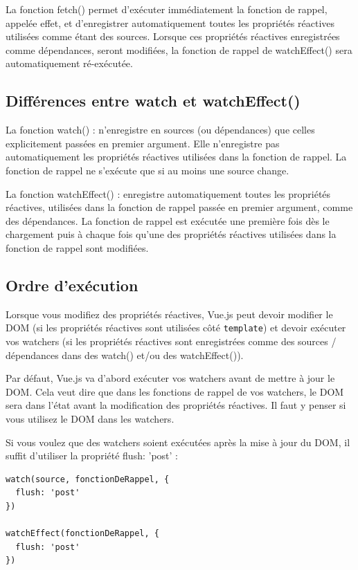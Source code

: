 \documentclass{article}
\begin{document}
La fonction {\color{monOrange}fetch()} permet d'exécuter immédiatement la fonction de rappel, appelée effet, et d'enregistrer automatiquement toutes les propriétés réactives utilisées comme étant des sources. Lorsque ces propriétés réactives enregistrées comme dépendances, seront modifiées, la fonction de rappel de {\color{monOrange}watchEffect()} sera automatiquement ré-exécutée.

\subsection{Différences entre {\color{monOrange}watch} et {\color{monOrange}watchEffect()}}
La fonction {\color{monOrange}watch()} : n'enregistre en sources (ou dépendances) que celles explicitement passées en premier argument. Elle n'enregistre pas automatiquement les propriétés réactives utilisées dans la fonction de rappel. La fonction de rappel ne s'exécute que si au moins une source change.

La fonction {\color{monOrange}watchEffect()} : enregistre automatiquement toutes les propriétés réactives, utilisées dans la fonction de rappel passée en premier argument, comme des dépendances. La fonction de rappel est exécutée une première fois dès le chargement puis à chaque fois qu'une des propriétés réactives utilisées dans la fonction de rappel sont modifiées.

\subsection{Ordre d'exécution}
Lorsque vous modifiez des propriétés réactives, {\color{monOrange}Vue.js} peut devoir modifier le DOM (si les propriétés réactives sont utilisées côté {\tt template}) et devoir exécuter vos {\color{monOrange}watchers} (si les propriétés réactives sont enregistrées comme des sources / dépendances dans des {\color{monOrange}watch()} et/ou des {\color{monOrange}watchEffect()}).

Par défaut, {\color{monOrange}Vue.js} va d'abord exécuter vos {\color{monOrange}watchers} avant de mettre à jour le DOM. Cela veut dire que dans les fonctions de rappel de vos {\color{monOrange}watchers}, le DOM sera dans l'état avant la modification des propriétés réactives. Il faut y penser si vous utilisez le DOM dans les {\color{monOrange}watchers}.

Si vous voulez que des {\color{monOrange}watchers} soient exécutées après la mise à jour du DOM, il suffit d'utiliser la propriété flush: {\color{monOrange}'post'} :
\begin{verbatim}
watch(source, fonctionDeRappel, {
  flush: 'post'
})

watchEffect(fonctionDeRappel, {
  flush: 'post'
})
\end{verbatim}
\end{document}
